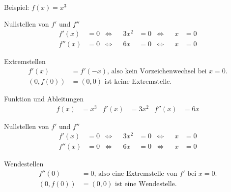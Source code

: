 \begin{*taskframes}{Beispiel: $f(x) = x^3$}
\begin{taskframe}
    \begin{mathbox}{Nullstellen von $f'$ und $f''$}
        \begin{align*}
            f'(x) &= 0 & \Leftrightarrow && 3x^2 &= 0 & \Leftrightarrow && x &= 0 \\
            f''(x) &= 0 & \Leftrightarrow && 6x &= 0 & \Leftrightarrow && x &= 0
        \end{align*}
    \end{mathbox}
    \begin{mathbox}{Extremstellen}
        \begin{align*}
            f'(x) &= f'(-x) \text{, also kein Vorzeichenwechsel bei $x=0$.} \\
            (0, f(0)) &= (0, 0) \text{ ist keine Extremstelle.}
        \end{align*}
    \end{mathbox}
\end{taskframe}

\begin{taskframe}
    \begin{mathbox}{Funktion und Ableitungen}
        \begin{align*}
            f(x) &= x^3 & f'(x) &= 3x^2 & f''(x) &= 6x
        \end{align*}
    \end{mathbox}

    \begin{mathbox}{Nullstellen von $f'$ und $f''$}
        \begin{align*}
            f'(x) &= 0 & \Leftrightarrow && 3x^2 &= 0 & \Leftrightarrow && x &= 0 \\
            f''(x) &= 0 & \Leftrightarrow && 6x &= 0 & \Leftrightarrow && x &= 0
        \end{align*}
    \end{mathbox}
    \begin{mathbox}{Wendestellen}
        \begin{align*}
            f''(0) &= 0 \text{, also eine Extremstelle von $f'$ bei $x=0$.} \\
            (0, f(0)) &= (0, 0) \text{ ist eine Wendestelle.}
        \end{align*}
    \end{mathbox}
\end{taskframe}

\end{*taskframes}
